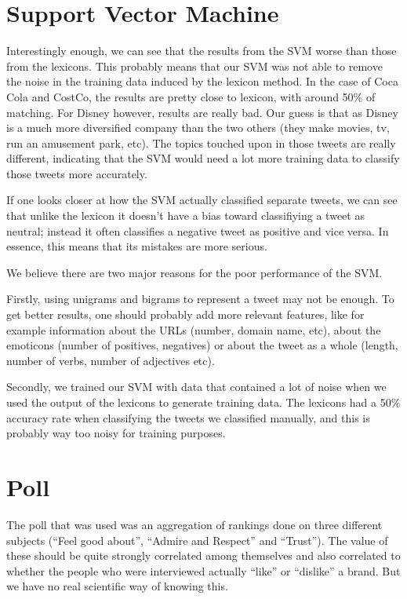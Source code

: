 \documentclass[a4paper,12pt]{report}
\begin{document}
\section{Support Vector Machine}

Interestingly enough, we can see that the results from the SVM worse than those from the lexicons.
This probably means that our SVM was not able to remove the noise in the training data induced by the lexicon method.
In the case of Coca Cola and CostCo, the results are pretty close to lexicon, with around 50\% of matching.
For Disney however, results are really bad. 
Our guess is that as Disney is a much more diversified company than the two others (they make movies, tv, run an amusement park, etc). The topics touched upon in those tweets are really different, indicating that the SVM would need a lot more training data to classify those tweets more accurately.

If one looks closer at how the SVM actually classified separate tweets, we can see that unlike the lexicon it doesn't have a bias toward classifiying a tweet as neutral; instead it often classifies a negative tweet as positive and vice versa.
In essence, this means that its mistakes are more serious.

We believe there are two major reasons for the poor performance of the SVM.

Firstly, using unigrams and bigrams to represent a tweet may not be enough. To get better results, one should probably add more relevant features, like for example information about the URLs (number, domain name, etc), about the emoticons (number of positives, negatives) or about the tweet as a whole (length, number of verbs, number of adjectives etc).


Secondly, we trained our SVM with data that contained a lot of noise when we used the output of the lexicons to generate training data. The lexicons had a 50\% accuracy rate when classifying the tweets we classified manually, and this is probably way too noisy for training purposes.

\section{Poll}

The poll that was used was an aggregation of rankings done on three different subjects (“Feel good about”, “Admire and Respect” and “Trust”). The value of these should be quite strongly correlated among themselves and also correlated to whether the people who were interviewed actually “like” or “dislike” a brand. But we have no real scientific way of knowing this.
\end{document}

